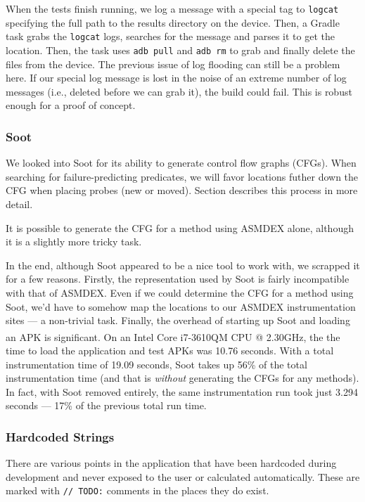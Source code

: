 When the tests finish running, we log a message with a special tag to {\tt logcat} specifying the full path to the results directory on the device. Then, a Gradle task grabs the {\tt logcat} logs, searches for the message and parses it to get the location. Then, the task uses {\tt adb pull} and {\tt adb rm} to grab and finally delete the files from the device. The previous issue of log flooding can still be a problem here. If our special log message is lost in the noise of an extreme number of log messages (i.e., deleted before we can grab it), the build could fail. This is robust enough for a proof of concept.

\subsubsection{Soot}

We looked into Soot for its ability to generate control flow graphs (CFGs). When searching for failure-predicting predicates, we will favor locations futher down the CFG when placing probes (new or moved). Section  describes this process in more detail.

It is possible to generate the CFG for a method using ASMDEX alone, although it is a slightly more tricky task.

In the end, although Soot appeared to be a nice tool to work with, we scrapped it for a few reasons. Firstly, the representation used by Soot is fairly incompatible with that of ASMDEX. Even if we could determine the CFG for a method using Soot, we'd have to somehow map the locations to our ASMDEX instrumentation sites --- a non-trivial task. Finally, the overhead of starting up Soot and loading an APK is significant. On an Intel\textsuperscript{\textregistered} Core\textsuperscript{\texttrademark} i7-3610QM CPU @ 2.30GHz, the the time to load the application and test APKs was 10.76 seconds. With a total instrumentation time of 19.09 seconds, Soot takes up 56\% of the total instrumentation time (and that is \textit{without} generating the CFGs for any methods). In fact, with Soot removed entirely, the same instrumentation run took just 3.294 seconds --- 17\% of the previous total run time.

\subsubsection{Hardcoded Strings}

There are various points in the application that have been hardcoded during development and never exposed to the user or calculated automatically. These are marked with \texttt{// TODO:} comments in the places they do exist.

